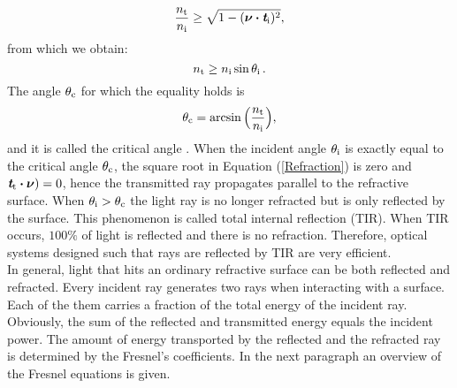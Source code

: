 \begin{equation}
\frac{n_\textrm{t}}{n_\textrm{i}}\geq \sqrt{1-(\boldsymbol{\nu}\boldsymbol{\cdot}\textit{\textbf{t}}_\textrm{i})^2},
\end{equation}
from which we obtain:
\begin{equation}
 n_\textrm{t}\geq n_\textrm{i} \sin\theta_\textrm{i}\,.
\end{equation}
 The angle $\theta_{\textrm{c}}$ for which the equality holds is
\begin{equation}\label{critical}
\theta_{\textrm{c}} = \arcsin\Big(\frac{n_\textrm{t}}{n_\textrm{i}}\Big),
\end{equation} and it is called the critical angle \cite{chaves2015introduction}.
When the incident angle $\theta_{\textrm{i}}$ is exactly equal to the critical angle $\theta_{\textrm{c}}$, the square root in Equation (\ref{Refraction}) is zero and $\textit{\textbf{t}}_\textrm{t}\boldsymbol{\cdot}\boldsymbol{\nu})=0$, hence the transmitted ray propagates parallel to the refractive surface. 
When $\theta_{\textrm{i}}>\theta_{\textrm{c}}$ the light ray is no longer refracted but is only reflected by the surface. This phenomenon is called total internal reflection (TIR). When TIR occurs, $100\%$ of light is reflected and there is no refraction. Therefore, optical systems designed such that rays are reflected by TIR are very efficient. \\ \indent 
In general, light that hits an ordinary refractive surface can be both reflected and refracted. Every incident ray generates two rays when interacting with a surface. Each of the them carries a fraction of the total energy of the incident ray. Obviously, the sum of the reflected and transmitted energy equals the incident power.
The amount of energy transported by the reflected and the refracted ray is determined by the Fresnel's coefficients.
In the next paragraph an overview of the Fresnel equations is given.
